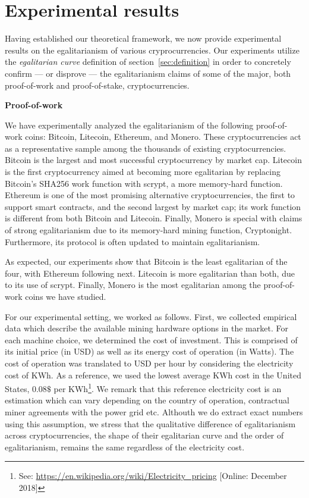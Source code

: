 \section{Experimental results}\label{sec:experiments}

Having established our theoretical framework, we now provide experimental
results on the egalitarianism of various cryprocurrencies. Our experiments
utilize the \emph{egalitarian curve} definition of section~\ref{sec:definition}
in order to concretely confirm --- or disprove --- the egalitarianism claims of
some of the major, both proof-of-work and proof-of-stake, cryptocurrencies.

\noindent\textbf{Proof-of-work}

\noindent
We have experimentally analyzed the egalitarianism of the following
proof-of-work coins: Bitcoin, Litecoin, Ethereum, and Monero. These
cryptocurrencies act as a representative sample among the thousands of existing
cryptocurrencies. Bitcoin is the largest and most successful cryptocurrency by
market cap. Litecoin is the first cryptocurrency aimed at becoming more
egalitarian by replacing Bitcoin's SHA256 work function with scrypt, a more
memory-hard function. Ethereum is one of the most promising alternative
cryptocurrencies, the first to support smart contracts, and the second largest
by market cap; its work function is different from both Bitcoin and Litecoin.
Finally, Monero is special with claims of strong egalitarianism due to its
memory-hard mining function, Cryptonight. Furthermore, its protocol is often
updated to maintain egalitarianism.

As expected, our experiments show that Bitcoin is the least egalitarian of the
four, with Ethereum following next. Litecoin is more egalitarian than both, due
to its use of scrypt. Finally, Monero is the most egalitarian among the
proof-of-work coins we have studied.


For our experimental setting, we worked as follows. First, we collected
empirical data which describe the available mining hardware options in the
market. For each machine choice, we determined the cost of investment. This is
comprised of its initial price (in USD) as well as its energy cost of operation
(in Watts). The cost of operation was translated to USD per hour by considering
the electricity cost of KWh. As a reference, we used the lowest average KWh
cost in the United States, \ie $0.08\$$ per KWh\footnote{See:
\url{https://en.wikipedia.org/wiki/Electricity_pricing} [Online: December
2018]}. We remark that this reference electricity cost is an estimation which
can vary depending on the country of operation, contractual miner agreements
with the power grid etc. Althouth we do extract exact numbers using this
assumption, we stress that the qualitative difference of egalitarianism across
cryptocurrencies, \ie the shape of their egalitarian curve and the order of
egalitarianism, remains the same regardless of the electricity cost.

